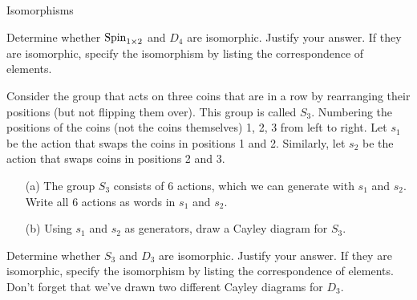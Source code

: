 \begin{section}{Isomorphisms}
\begin{problem}
Determine whether \(\operatorname{Spin}_{1\times 2}\) and \(D_4\) are isomorphic.  Justify your answer.  If they are isomorphic, specify the isomorphism by listing the correspondence of elements.
\end{problem}

\begin{exercise}\label{exer:S_3}
Consider the group that acts on three coins that are in a row by rearranging their positions (but not flipping them over).  This group is called \(S_3\).  Numbering the positions of the coins (not the coins themselves) 1, 2, 3 from left to right.  Let \(s_1\) be the action that swaps the coins in positions 1 and 2.  Similarly, let \(s_2\) be the action that swaps coins in positions 2 and 3.
\begin{enumerate}
\item[(a)] The group \(S_3\) consists of 6 actions, which we can generate with \(s_1\) and \(s_2\).  Write all 6 actions as words in \(s_1\) and \(s_2\).
\item[(b)] Using \(s_1\) and \(s_2\) as generators, draw a Cayley diagram for \(S_3\).
\end{enumerate}
\end{exercise}

\begin{problem}\label{prob:D3_iso_S3}
Determine whether \(S_3\) and \(D_3\) are isomorphic.  Justify your answer.  If they are isomorphic, specify the isomorphism by listing the correspondence of elements.  Don't forget that we've drawn two different Cayley diagrams for \(D_3\).
\end{problem}

\end{section}
